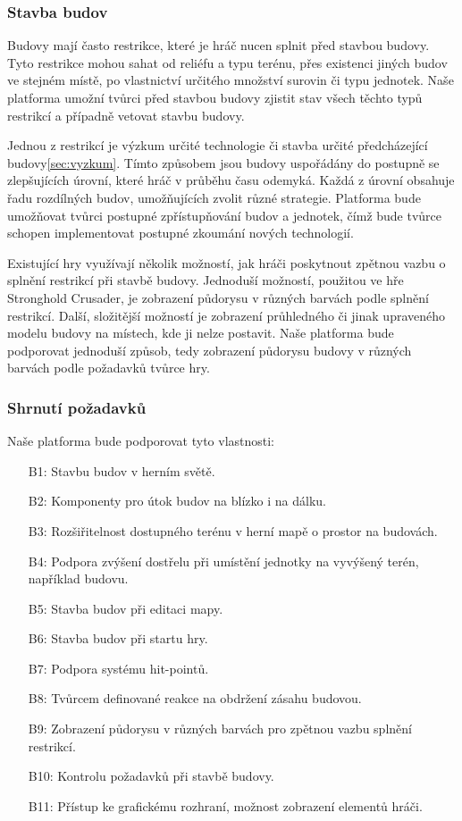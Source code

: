 \subsubsection{Stavba budov}
\done
{}
Budovy mají často restrikce, které je hráč nucen splnit před stavbou budovy. Tyto restrikce mohou sahat od reliéfu a typu terénu, přes existenci jiných budov ve stejném místě, po vlastnictví určitého množství surovin či typu jednotek. Naše platforma umožní tvůrci před stavbou budovy zjistit stav všech těchto typů restrikcí a případně vetovat stavbu budovy. 

Jednou z restrikcí je výzkum určité technologie či stavba určité předcházející budovy\ref{sec:vyzkum}. Tímto způsobem jsou budovy uspořádány do postupně se zlepšujících úrovní, které hráč v průběhu času odemyká. Každá z úrovní obsahuje řadu rozdílných budov, umožňujících zvolit různé strategie. Platforma bude umožňovat tvůrci postupné zpřístupňování budov a jednotek, čímž bude tvůrce schopen implementovat postupné zkoumání nových technologií.

Existující hry využívají několik možností, jak hráči poskytnout zpětnou vazbu o splnění restrikcí při stavbě budovy. Jednoduší možností, použitou ve hře Stronghold Crusader, je zobrazení půdorysu v různých barvách podle splnění restrikcí. Další, složitější možností je zobrazení průhledného či jinak upraveného modelu budovy na místech, kde ji nelze postavit.  Naše platforma bude podporovat jednoduší způsob, tedy zobrazení půdorysu budovy v různých barvách podle požadavků tvůrce hry.

\subsubsection{Shrnutí požadavků}

Naše platforma bude podporovat tyto vlastnosti:
\begin{itemize}
	\item[B1:] Stavbu budov v herním světě.
	\item[B2:] Komponenty pro útok budov na blízko i na dálku.
	\item[B3:] Rozšiřitelnost dostupného terénu v herní mapě o prostor na budovách.
	\item[B4:] Podpora zvýšení dostřelu při umístění jednotky na vyvýšený terén, například budovu.
	\item[B5:] Stavba budov při editaci mapy.
	\item[B6:] Stavba budov při startu hry.
	\item[B7:] Podpora systému hit-pointů.
	\item[B8:] Tvůrcem definované reakce na obdržení zásahu budovou.
	\item[B9:] Zobrazení půdorysu v různých barvách pro zpětnou vazbu splnění restrikcí.
	\item[B10:] Kontrolu požadavků při stavbě budovy.
	\item[B11:] Přístup ke grafickému rozhraní, možnost zobrazení elementů hráči.
\end{itemize}


